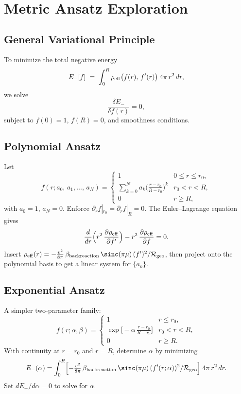 \section{Metric Ansatz Exploration}

\subsection{General Variational Principle}
To minimize the total negative energy
\[
  E_{-}[f] \;=\;\int_0^R \rho_{\rm eff}\bigl(f(r),\,f'(r)\bigr)\;4\pi\,r^2\,dr,
\]
we solve
\[
  \frac{\delta E_{-}}{\delta f(r)} = 0,
\]
subject to $f(0)=1$, $f(R)=0$, and smoothness conditions.

\subsection{Polynomial Ansatz}
Let
\[
  f(r; a_0,\,a_1,\dots,\,a_N) 
  = 
  \begin{cases}
    1 & 0 \le r \le r_0, \\
    \displaystyle 
    \sum_{k=0}^N a_k \bigl(\tfrac{r - r_0}{R - r_0}\bigr)^k 
      & r_0 < r < R, \\
    0 & r \ge R,
  \end{cases}
\]
with $a_0=1$, $a_N=0$.  Enforce $\partial_r f|_{r_0}=\partial_r f|_{R}=0$.  
The Euler–Lagrange equation gives
\[
  \frac{d}{dr}\Bigl( r^2\,\frac{\partial \rho_{\rm eff}}{\partial f'}\Bigr) 
    - r^2\,\frac{\partial \rho_{\rm eff}}{\partial f} = 0.
\]
Insert $\rho_{\rm eff}(r)= -\tfrac{v^2}{8\pi}\,\beta_{\rm backreaction}\,\sinc(\pi\mu)\,(f')^2 / \mathcal{R}_{\rm geo}$,
then project onto the polynomial basis to get a linear system for $\{a_k\}$.

\subsection{Exponential Ansatz}
A simpler two‐parameter family:
\[
  f(r;\alpha,\beta) 
  = 
  \begin{cases}
    1 & r \le r_0, \\
    \exp\bigl[-\alpha\,\frac{r-r_0}{R-r_0}\bigr] & r_0 < r < R, \\
    0 & r \ge R.
  \end{cases}
\]
With continuity at $r=r_0$ and $r=R$, determine $\alpha$ by minimizing
\[
  E_{-}(\alpha) = \int_0^R 
    \Bigl[-\tfrac{v^2}{8\pi}\,\beta_{\rm backreaction}\,\sinc(\pi\mu)\,(f'(r;\alpha))^2 / \mathcal{R}_{\rm geo}\Bigr]\;4\pi\,r^2\,dr.
\]
Set $dE_{-}/d\alpha = 0$ to solve for $\alpha$.

